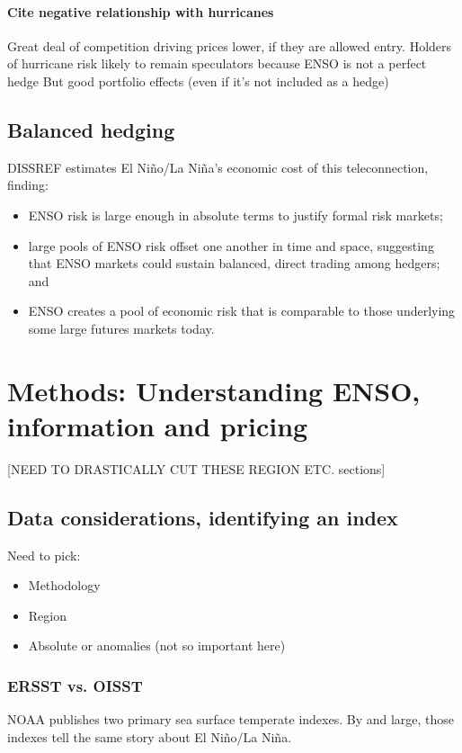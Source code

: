 \documentclass[authoryear]{article}
\begin{document}
\paragraph{Cite negative relationship with hurricanes}
Great deal of competition driving prices lower, if they are allowed entry.
Holders of hurricane risk likely to remain speculators because ENSO is not a perfect hedge 
But good portfolio effects (even if it's not included as a hedge)


\subsection{Balanced hedging}

DISSREF estimates El Ni\~no/La Ni\~na's economic cost of this teleconnection, finding:
\begin{itemize} 
\item ENSO risk is large enough in absolute terms to justify formal risk markets;
\item large pools of ENSO risk offset one another in time and space, suggesting that ENSO markets could sustain balanced, direct trading among hedgers; and 
\item ENSO creates a pool of economic risk that is comparable to those underlying some large futures markets today.
\end{itemize}



\section{Methods: Understanding ENSO, information and pricing}
[NEED TO DRASTICALLY CUT THESE REGION ETC. sections]
\subsection{Data considerations, identifying an index}
Need to pick:
\begin{itemize}
\item Methodology
\item Region
\item Absolute or anomalies (not so important here)
\end{itemize}

\subsubsection{ERSST vs. OISST}

NOAA publishes two primary sea surface temperate indexes. By and large, those indexes tell the same story about El Ni\~no/La Ni\~na.
\end{document}
